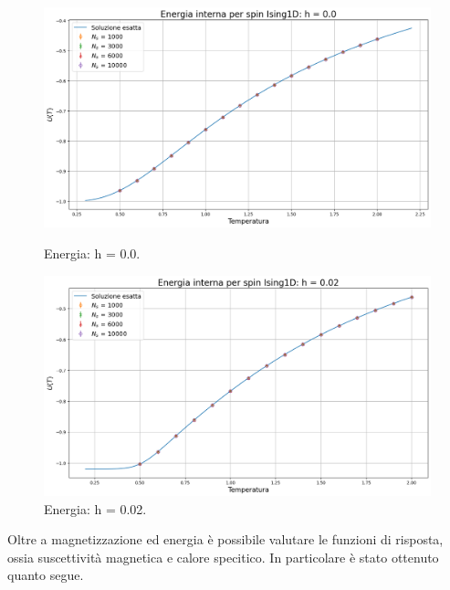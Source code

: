 \begin{figure}[htbp]
    \centering
    \begin{minipage}{0.5\textwidth}  
      \centering
      \includegraphics[page=1, width=\textwidth]{Immagini/simIsing1D/ene_h0.0.png}
      \caption{Energia: h = 0.0.}
    \end{minipage}\hfill
    \begin{minipage}{0.5\textwidth}  
      \centering
      \includegraphics[page=1, width=\textwidth]{Immagini/simIsing1D/ene_h0.02.png}
      \caption{Energia: h = 0.02.}
    \end{minipage}
\end{figure}

Oltre a magnetizzazione ed energia è possibile valutare le funzioni di risposta, ossia suscettività magnetica e calore specitico. In 
particolare è stato ottenuto quanto segue.

